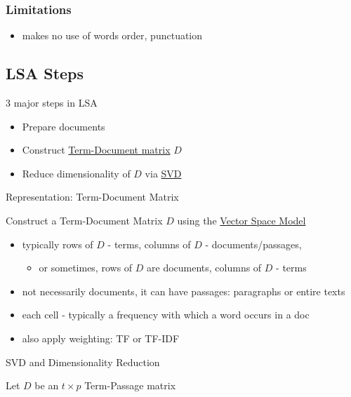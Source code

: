 \subsubsection{Limitations}\label{limitations}

\begin{itemize}
\itemsep1pt\parskip0pt
\item
  makes no use of words order, punctuation
\end{itemize}

\subsection{LSA Steps}\label{lsa-steps}

3 major steps in LSA \cite{evangelopoulos2012latent}

\begin{itemize}
\itemsep1pt\parskip0pt
\item
  Prepare documents
\item
  Construct \href{Vector Space Models}{Term-Document matrix} $D$
\item
  Reduce dimensionality of $D$ via \url{SVD}
\end{itemize}


Representation: Term-Document Matrix

Construct a Term-Document Matrix $D$ using the
\href{Vector Space Model}{Vector Space Model}

\begin{itemize}
\itemsep1pt\parskip0pt
\item
  typically rows of $D$ - terms, columns of $D$ -
  documents/passages,

  \begin{itemize}
  \itemsep1pt\parskip0pt
  \item
    or sometimes, rows of $D$ are documents, columns of $D$ - terms
  \end{itemize}
\item
  not necessarily documents, it can have passages: paragraphs or entire
  texts
\item
  each cell - typically a frequency with which a word occurs in a doc
\item
  also apply weighting: TF or TF-IDF
\end{itemize}

SVD and Dimensionality Reduction

Let $D$ be an $t \times p$ Term-Passage matrix

